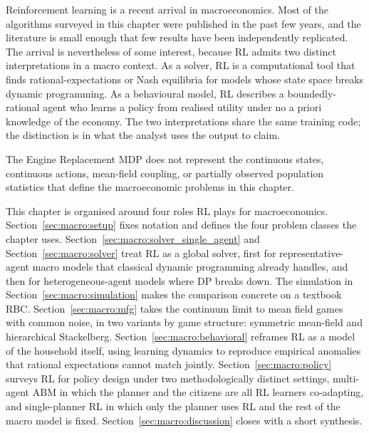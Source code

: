 
Reinforcement learning is a recent arrival in macroeconomics. Most of
the algorithms surveyed in this chapter were published in the past
few years, and the literature is small enough that few results have
been independently replicated. The arrival is nevertheless of some
interest, because RL admits two distinct interpretations in a macro
context. As
a solver, RL is a computational tool that finds rational-expectations
or Nash equilibria for models whose state space breaks dynamic
programming. As a behavioural model, RL describes a boundedly-rational
agent who learns a policy from realised utility under no a priori
knowledge of the economy. The two interpretations share the same
training code; the distinction is in what the analyst uses the output
to claim.

The Engine Replacement MDP does not represent the continuous states,
continuous actions, mean-field coupling, or partially observed population
statistics that define the macroeconomic problems in this chapter.

This chapter is organised around four roles RL plays for
macroeconomics. Section~\ref{sec:macro:setup} fixes notation and
defines the four problem classes the chapter uses.
Section~\ref{sec:macro:solver_single_agent} and
Section~\ref{sec:macro:solver} treat RL as a global solver, first for
representative-agent macro models that classical dynamic programming
already handles, and then for heterogeneous-agent models where DP
breaks down. The simulation in
Section~\ref{sec:macro:simulation} makes the comparison concrete on a
textbook RBC. Section~\ref{sec:macro:mfg} takes the continuum limit
to mean field games with common noise, in two variants by game
structure: symmetric mean-field and hierarchical Stackelberg.
Section~\ref{sec:macro:behavioral} reframes RL as a model of the
household itself, using learning dynamics to reproduce empirical
anomalies that rational expectations cannot match jointly.
Section~\ref{sec:macro:policy} surveys RL for policy design under
two methodologically distinct settings, multi-agent ABM in which
the planner and the citizens are all RL learners co-adapting, and
single-planner RL in which only the planner uses RL and the rest of
the macro model is fixed.
Section~\ref{sec:macro:discussion} closes with a short synthesis.

